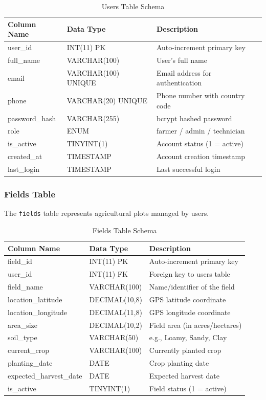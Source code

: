 \begin{table}[H]
\centering
\small
\begin{tabular}{|l|l|p{6cm}|}
\hline
\textbf{Column Name} & \textbf{Data Type} & \textbf{Description} 
\\ \hline
user\_id & INT(11) PK & Auto-increment primary key \\ \hline
full\_name & VARCHAR(100) & User's full name \\ \hline
email & VARCHAR(100) UNIQUE & Email address for authentication 
\\ \hline
phone & VARCHAR(20) UNIQUE & Phone number with country code \\ \hline
password\_hash & VARCHAR(255) & bcrypt hashed password \\ \hline
role & ENUM & farmer / admin / technician \\ \hline
is\_active & TINYINT(1) & Account status (1 = active) \\ \hline
created\_at & TIMESTAMP & Account creation timestamp \\ \hline
last\_login & TIMESTAMP & Last successful login \\ \hline
\end{tabular}
\caption{Users Table Schema}
\label{tab:users-schema}
\end{table}

\subsubsection{Fields Table}
The \texttt{fields} table represents agricultural plots managed 
by users.

\begin{table}[H]
\centering
\small
\begin{tabular}{|l|l|p{6cm}|}
\hline
\textbf{Column Name} & \textbf{Data Type} & \textbf{Description} 
\\ \hline
field\_id & INT(11) PK & Auto-increment primary key \\ \hline
user\_id & INT(11) FK & Foreign key to users table \\ \hline
field\_name & VARCHAR(100) & Name/identifier of the field \\ \hline
location\_latitude & DECIMAL(10,8) & GPS latitude coordinate \\ 
\hline
location\_longitude & DECIMAL(11,8) & GPS longitude coordinate \\ 
\hline
area\_size & DECIMAL(10,2) & Field area (in acres/hectares) \\ \hline
soil\_type & VARCHAR(50) & e.g., Loamy, Sandy, Clay \\ \hline
current\_crop & VARCHAR(100) & Currently planted crop \\ \hline
planting\_date & DATE & Crop planting date \\ \hline
expected\_harvest\_date & DATE & Expected harvest date \\ \hline
is\_active & TINYINT(1) & Field status (1 = active) \\ \hline
\end{tabular}
\caption{Fields Table Schema}
\label{tab:fields-schema}
\end{table}

